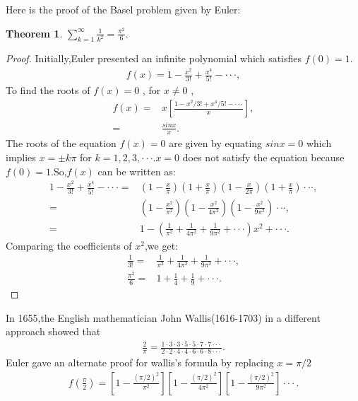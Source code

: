 \documentclass[a4paper,reqno,11pt]{book}
\theoremstyle{plain}%
\newtheorem{thm}{Theorem}[chapter]
\theoremstyle{definition}
\begin{document}
\noindent Here is the proof of the Basel problem given by Euler:\\
\begin{thm}\label{thm:Type 1}
$\sum_{k=1}^{\infty}\frac{1}{k^2}=\frac{\pi^2}{6}.$
\end{thm}
\begin{proof}
Initially,Euler presented an infinite polynomial which satisfies $f(0)=1$.
\begin{eqnarray*}
    f(x)=1-\frac{x^2}{3!}+\frac{x^4}{5!}-\cdot\cdot\cdot,
\end{eqnarray*}
To find the roots of $f(x)=0$ , for $x\neq0$ ,
\begin{align}
     f(x)=&x\left[\frac{1-x^2/3!+x^4/5!-\cdot\cdot\cdot}{x}\right],\\
         =&\frac{sinx}{x}.
\end{align}
The roots of the equation $f(x)=0$ are given by equating $sinx=0$ which implies $x=\pm k\pi$ for $k=1,2,3,\cdot\cdot\cdot$.$x=0$ does not satisfy the equation because $f(0)=1$.So,$f(x)$ can be written as:
\begin{align}
     1-\frac{x^2}{3!}+\frac{x^4}{5!}-\cdot\cdot\cdot=&\left(1-\frac{x}{\pi}\right)\left(1+\frac{x}{\pi}\right)\left(1-\frac{x}{2\pi}\right)\left(1+\frac{x}{\pi}\right)\cdot\cdot\cdot,\\
     =&\left(1-\frac{x^2}{\pi^2}\right)\left(1-\frac{x^2}{4\pi^2}\right)\left(1-\frac{x^2}{9\pi^2}\right)\cdot\cdot\cdot,\\
     =&1-\left(\frac{1}{\pi^2}+\frac{1}{4\pi^2}+\frac{1}{9\pi^2}+\cdot\cdot\cdot\right)x^2+\cdot\cdot\cdot.
\end{align}
Comparing the coefficients of $x^2$,we get:
\begin{align*}
    \frac{1}{3!}=&\frac{1}{\pi^2}+\frac{1}{4\pi^2}+\frac{1}{9\pi^2}+\cdot\cdot\cdot,\\
    \frac{\pi^2}{6}=&1+\frac{1}{4}+\frac{1}{9}+\cdot\cdot\cdot. 
\end{align*}
\end{proof}
\noindent In 1655,the English mathematician John Wallis(1616-1703) in a different approach showed that
\begin{eqnarray*}
    \frac{2}{\pi}=\frac{1\cdot3\cdot3\cdot5\cdot5\cdot7\cdot7\cdot\cdot\cdot}{2\cdot2\cdot4\cdot4\cdot6\cdot6\cdot8\cdot\cdot\cdot}.
\end{eqnarray*}
Euler gave an alternate proof for wallis's formula by replacing $x=\pi/2$
\begin{eqnarray*}
    f\left(\frac{\pi}{2}\right)=\left[1-\frac{(\pi/2)^2}{\pi^2}\right]\left[1-\frac{(\pi/2)^2}{4\pi^2}\right]\left[1-\frac{(\pi/2)^2}{9\pi^2}\right]\cdot\cdot\cdot.
\end{eqnarray*}
\end{document}
